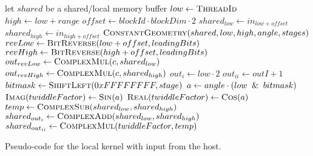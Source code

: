 \begin{algorithm}
	\centering
	\begin{algorithmic}[1]
            \State let $shared$ be a shared/local memory buffer     
            \State $low  \gets \Call{ThreadId}{}$
            \State $high \gets low + range$   
            \State $offset \gets blockId \cdot blockDim \cdot 2$
			\newline
            \State $shared_{low}  \gets in_{low + offset}$
            \State $shared_{high} \gets in_{high + offset}$
            \State $\Call{ConstantGeometry}{shared, low, high, angle, stages}$
            \newline
            \State $revLow  \gets \Call{BitReverse}{low + offset, leadingBits}$
            \State $revHigh \gets \Call{BitReverse}{high + offset, leadingBits}$
            \State $out_{revLow}  \gets \Call{ComplexMul}{c, shared_{low}}$
            \State $out_{revHigh} \gets \Call{ComplexMul}{c, shared_{high}}$
        \EndProcedure
        \Statex
            \State $out_{i} \gets low \cdot 2$
            \State $out_{ii} \gets outI + 1$
	            \newline
            	\State $bitmask \gets \Call{ShiftLeft}{0xFFFFFFFF, stage}$
            	\State $a \gets angle \cdot (low \And bitmask)$
            	\State $\Call{Imag}{twiddleFactor} \gets \Call{Sin}{a}$
            	\State $\Call{Real}{twiddleFactor} \gets \Call{Cos}{a}$
            	\newline
				\State $temp \gets \Call{ComplexSub}{shared_{low}, shared_{high}}$
				\State $shared_{out_{i}} \gets \Call{ComplexAdd}{shared_{low}, shared_{high}}$
				\State $shared_{out_{ii}} \gets \Call{ComplexMul}{twiddleFactor, temp}$
			\EndFor
        \EndProcedure
	\end{algorithmic}
	\caption{Pseudo-code for the local kernel with input from the host.}
	\label{alg:device:local-kernel}
\end{algorithm}